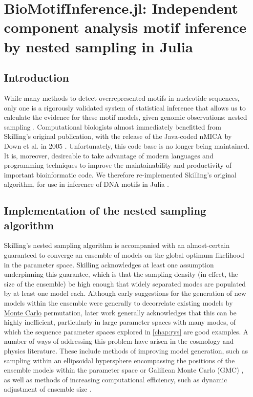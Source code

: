 \chapter{BioMotifInference.jl: Independent component analysis motif inference by nested sampling in Julia}
\label{ch:BMI}
\section{Introduction}
While many methods to detect overrepresented motifs in nucleotide sequences, only one is a rigorously validated system of statistical inference that allows us to calculate the evidence for these motif models, given genomic observations: nested sampling \cite{Skilling2006}. Computational biologists almost immediately benefitted from Skilling's original publication, with the release of the Java-coded nMICA by Down et al. in 2005 \cite{Down2005}. Unfortunately, this code base is no longer being maintained. It is, moreover, desireable to take advantage of modern languages and programming techniques to improve the maintainability and productivity of important bioinformatic code. We therefore re-implemented Skilling's original algorithm, for use in inference of DNA motifs in Julia \cite{Bezanson2015}.

\section{Implementation of the nested sampling algorithm}

Skilling's nested sampling algorithm is accompanied with an almost-certain guaranteed to converge an ensemble of models on the global optimum likelihood in the parameter space\cite{Skilling2006}. Skilling acknowledges at least one assumption underpinning this guarantee, which is that the sampling density (in effect, the size of the ensemble) be high enough that widely separated modes are populated by at least one model each. Although early suggestions for the generation of new models within the ensemble were generally to decorrelate existing models by \hyperref[ssec:MonteCarlo]{Monte Carlo} permutation, later work generally acknowledges that this can be highly inefficient, particularly in large parameter spaces with many modes, of which the sequence parameter spaces explored in \autoref{chap:rys} are good examples. A number of ways of addressing this problem have arisen in the cosmology and physics literature. These include methods of improving model generation, such as sampling within an ellipsoidal hypersphere encompassing the positions of the ensemble models within the parameter space \cite{Feroz2008,Feroz2009} or Galiliean Monte Carlo (GMC) \cite{Skilling2012}, as well as methods of increasing computational efficiency, such as dynamic adjustment of ensemble size \cite{Higson2019}. 

